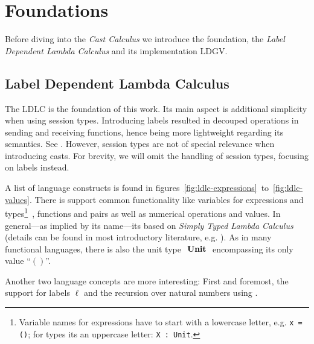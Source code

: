 \chapter{Foundations}\label{chap:foundations}

Before diving into the \emph{Cast Calculus} we introduce the foundation, the \emph{Label Dependent Lambda Calculus} and its implementation LDGV.

\section{Label Dependent Lambda Calculus}\label{sec:ldlc}

The LDLC is the foundation of this work. Its main aspect is additional simplicity when using session types. Introducing labels resulted in decouped operations in sending and receiving functions, hence being more lightweight regarding its semantics. See \cite{thiemann2019}. However, session types are not of special relevance when introducing casts. For brevity, we will omit the handling of session types, focusing on labels instead.

A list of language constructs is found in figures~\ref{fig:ldlc-expressions}~to~\ref{fig:ldlc-values}. There is support common functionality like variables  for expressions and types\footnote{
Variable names for expressions have to start with a lowercase letter, e.g. \texttt{\valb x = ()}; for types its an uppercase letter: \texttt{\typeb X : Unit}.}\
, functions and pairs as well as numerical operations and values. In general---as implied by its name---its based on \emph{Simply Typed Lambda Calculus} (details can be found in most introductory literature, e.g. \cite{pierce2002}). As in many functional languages, there is also the unit type $\text{ \textbf{Unit} }$ encompassing its only value ``$()$''.

Another two language concepts are more interesting: First and foremost, the support for labels $\ell$ and the recursion over natural numbers using \natrec.

